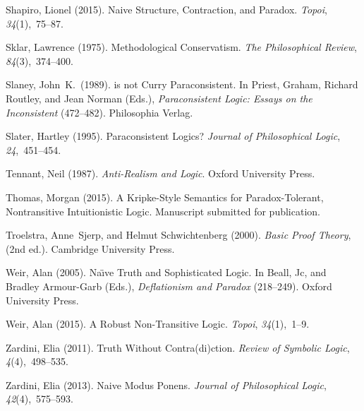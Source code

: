 \documentclass{ergoclass}
\begin{document}
\begin{thebibliography}{54}
Shapiro, Lionel (2015).
\newblock Naive Structure, Contraction, and Paradox.
\newblock \emph{Topoi}, \emph{34}(1),~75--87.

Sklar, Lawrence (1975).
\newblock Methodological Conservatism.
\newblock \emph{The Philosophical Review}, \emph{84}(3),~374--400.

Slaney, John~K.\ (1989).
 is not Curry Paraconsistent.
\newblock In Priest, Graham, Richard Routley, and Jean Norman (Eds.),
  \emph{Paraconsistent Logic: Essays on the Inconsistent} (472--482).
  Philosophia Verlag.

Slater, Hartley (1995).
\newblock Paraconsistent Logics?
\newblock \emph{Journal of Philosophical Logic}, \emph{24},~451--454.

Tennant, Neil (1987).
\newblock \emph{Anti-Realism and Logic}.
\newblock Oxford University Press.

Thomas, Morgan (2015).
\newblock A {K}ripke-Style Semantics for Paradox-Tolerant, Nontransitive
  Intuitionistic Logic.
\newblock Manuscript submitted for publication.

Troelstra, Anne~Sjerp, and Helmut Schwichtenberg (2000).
\newblock \emph{Basic Proof Theory}, (2nd ed.).
\newblock Cambridge University Press.

Weir, Alan (2005).
\newblock Na{\"{\i}}ve Truth and Sophisticated Logic.
\newblock In Beall, Jc, and Bradley Armour-Garb (Eds.), \emph{Deflationism and
  Paradox} (218--249). Oxford University Press.

Weir, Alan (2015).
\newblock A Robust Non-Transitive Logic.
\newblock \emph{Topoi}, \emph{34}(1),~1--9.

Zardini, Elia (2011).
\newblock Truth Without Contra(di)ction.
\newblock \emph{Review of Symbolic Logic}, \emph{4}(4),~498--535.

Zardini, Elia (2013).
\newblock Naive Modus Ponens.
\newblock \emph{Journal of Philosophical Logic}, \emph{42}(4),~575--593.

\end{thebibliography}
\end{document}
